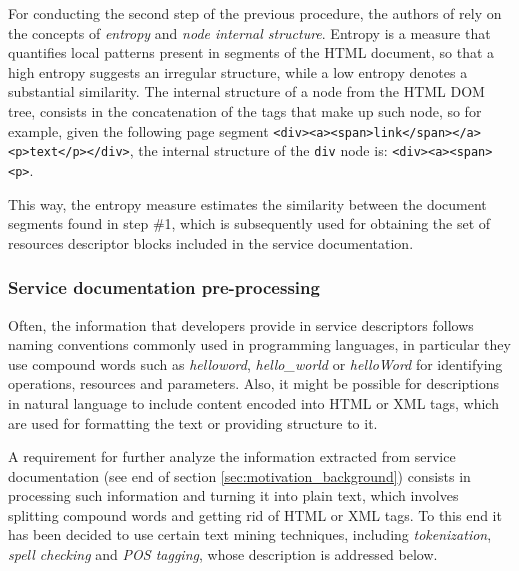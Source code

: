 For conducting the second step of the previous procedure, the authors of \cite{Ly:2012} rely on the concepts of \emph{entropy} and \emph{node internal structure}. Entropy is a measure that quantifies local patterns present in segments of the HTML document, so that a high entropy suggests
an irregular structure, while a low entropy denotes a substantial similarity. The internal structure of a node from the HTML DOM tree, consists in the concatenation of the tags that make up such node, so for example, given the following page segment \texttt{<div><a><span>link</span></a>\\<p>text</p></div>}, the internal structure of the \texttt{div} node is: \texttt{<div><a><span><p>}.

This way, the entropy measure estimates the similarity between the document segments found in step \#1, which is subsequently used for obtaining the set of resources descriptor blocks included in the service documentation.

\subsubsection{Service documentation pre-processing}
\label{subsub:Service-documentation-cleaning}
Often, the information that developers provide in service descriptors follows naming conventions commonly used in programming languages, in particular they use compound words such as \emph{helloword}, \emph{hello\_world} or \emph{helloWord} for identifying operations, resources and parameters. Also, it might be possible for descriptions in natural language to include content encoded into HTML or XML tags, which are used for formatting the text or providing structure to it. 

A requirement for further analyze the information extracted from service documentation (see end of section \ref{sec:motivation_background}) consists in processing such information and turning it into plain text, which involves splitting compound words and getting rid of HTML or XML tags. To this end it has been decided to use certain text mining techniques, including \emph{tokenization}, \emph{spell checking }and \emph{POS tagging}, whose description is addressed below. 

